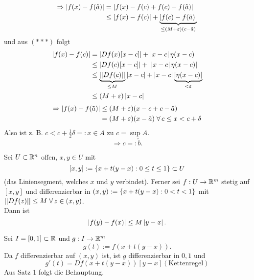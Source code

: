 \documentclass[../ana2.tex]{subfiles}
\begin{document}
\begin{bew}
    \begin{align*}
        \Rightarrow \left| f(x) - f(\tilde{a}) \right| 
        &= \left| f(x) - f(c) + f(c) - f(\tilde{a})\right| \\
        &\leq \left|f(x) - f(c)\right| 
        + \underbrace{\left|f(c) - f(\tilde{a})\right|}_{\leq (M+\varepsilon)(c - \tilde{a})}
    \end{align*}
    und aus \( (***) \) folgt 
    \begin{align*} 
        \left| f(x) - f(c) \right| &= \left|Df(x)[x - c]\right| + \left|x - c\right|\eta(x-c) \\
        &\leq \left|Df(c)[x - c]\right| + \left| \left|x-c\right|\eta(x-c) \right|\\
        &\leq \underbrace{\left|\left| Df(c) \right|\right|}_{\leq M} \left|x-c\right|
        + \left|x - c\right| \underbrace{\left| \eta(x-c) \right|}_{<\varepsilon} \\
        &\leq (M+\varepsilon) \left|x-c\right|
    \end{align*}
    \begin{align*}
        \Rightarrow \abs{f(x) - f(\tilde{a})} 
        &\leq (M+\varepsilon)(x - c + c - \tilde{a}) \\
        &= (M+\varepsilon)(x - \tilde{a}) \;\forall c \leq x < c + \delta
    \end{align*}
    Also ist z. B. \( c < c + \frac{1}{2} \delta =: x \in A \)
    \Lightning{} zu \(c = \sup A\).
    \[ \Rightarrow c =: \tilde{b}. \]
\end{bew}
\begin{kor}
    Sei \( U \subset \mathbb{R}^n \) offen, \(x,y \in U\) mit 
    \[ [x,y] := \{x+t(y-x): 0 \leq t \leq 1\} \subset U \]
    (das Liniensegment, welches \(x\) und \(y\) verbindet).
    Ferner sei \( f:U\rightarrow \mathbb{R}^m \) stetig auf \( [x,y] \)
    und differenzierbar in \((x,y) := \{x+t(y-x): 0 < t < 1\} \)
    mit \( \norm{Df(z)} \leq M \;\forall z \in (x,y) \).\\
    Dann ist 
    \[ \left|f(y) - f(x)\right| \leq M \left|y - x\right|. \]
\end{kor}
\begin{bew}
    Sei \( I = [0,1] \subset \mathbb{R} \) und 
    \( g:I\rightarrow \mathbb{R}^m \)
    \[ g(t) := f(x + t(y - x)). \]
    Da \(f\) differenzierbar auf \((x,y)\) ist, ist \(g\)
    differenzierbar in \(0,1\) und
    \[ g'(t) = Df(x+t(y-x))[y-x] (\text{Kettenregel}) \]
    Aus Satz 1 folgt die Behauptung.
\end{bew}
\end{document}
